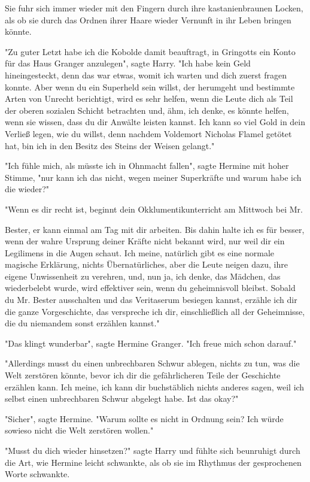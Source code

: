 {Sie fuhr sich immer wieder mit den Fingern durch ihre kastanienbraunen Locken, als ob sie durch das Ordnen ihrer Haare wieder Vernunft in ihr Leben bringen könnte.

"Zu guter Letzt habe ich die Kobolde damit beauftragt, in Gringotts ein Konto für das Haus Granger anzulegen", sagte Harry. "Ich habe kein Geld hineingesteckt, denn das war etwas, womit ich warten und dich zuerst fragen konnte. Aber wenn du ein Superheld sein willst, der herumgeht und bestimmte Arten von Unrecht berichtigt, wird es sehr helfen, wenn die Leute dich als Teil der oberen sozialen Schicht betrachten und, ähm, ich denke, es könnte helfen, wenn sie wissen, dass du dir Anwälte leisten kannst. Ich kann so viel Gold in dein Verließ legen, wie du willst, denn nachdem Voldemort Nicholas Flamel getötet hat, bin ich in den Besitz des Steins der Weisen gelangt."

"Ich fühle mich, als müsste ich in Ohnmacht fallen", sagte Hermine mit hoher Stimme, "nur kann ich das nicht, wegen meiner Superkräfte und warum habe ich die wieder?"

"Wenn es dir recht ist, beginnt dein Okklumentikunterricht am Mittwoch bei Mr.

Bester, er kann einmal am Tag mit dir arbeiten. Bis dahin halte ich es für besser, wenn der wahre Ursprung deiner Kräfte nicht bekannt wird, nur weil dir ein Legilimens in die Augen schaut. Ich meine, natürlich gibt es eine normale magische Erklärung, nichts Übernatürliches, aber die Leute neigen dazu, ihre eigene Unwissenheit zu verehren, und, nun ja, ich denke, das Mädchen, das wiederbelebt wurde, wird effektiver sein, wenn du geheimnisvoll bleibst. Sobald du Mr. Bester ausschalten und das Veritaserum besiegen kannst, erzähle ich dir die ganze Vorgeschichte, das verspreche ich dir, einschließlich all der Geheimnisse, die du niemandem sonst erzählen kannst."

"Das klingt wunderbar", sagte Hermine Granger. "Ich freue mich schon darauf."

"Allerdings musst du einen unbrechbaren Schwur ablegen, nichts zu tun, was die Welt zerstören könnte, bevor ich dir die gefährlicheren Teile der Geschichte erzählen kann. Ich meine, ich kann dir buchstäblich nichts anderes sagen, weil ich selbst einen unbrechbaren Schwur abgelegt habe. Ist das okay?"

"Sicher", sagte Hermine. "Warum sollte es nicht in Ordnung sein? Ich würde sowieso nicht die Welt zerstören wollen."

"Musst du dich wieder hinsetzen?" sagte Harry und fühlte sich beunruhigt durch die Art, wie Hermine leicht schwankte, als ob sie im Rhythmus der gesprochenen Worte schwankte.

}
